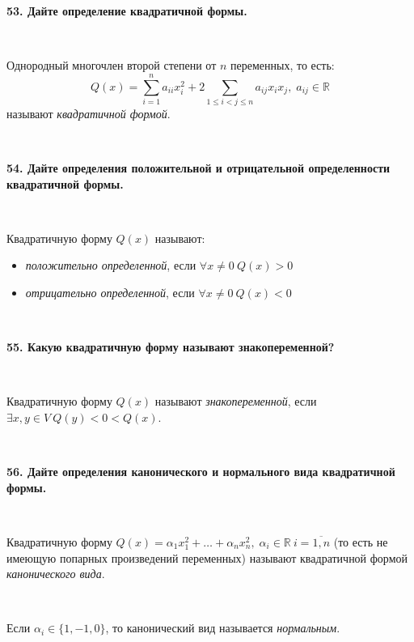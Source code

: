 \documentclass{article}
\begin{document}
	\textbf{53. Дайте определение квадратичной формы.}
	
	{
		$\;$
		\setlength{\parindent}{0.4cm}
		\hangindent=0.4cm
		
		Однородный многочлен второй степени от $n$ переменных, то есть: $$Q(x)=\sum\limits_{i=1}^n a_{ii}x_i^2+2\sum\limits_{1\leq i<j\leq n} a_{ij}x_ix_j,\; a_{ij}\in\mathbb{R}$$называют \textit{квадратичной формой}.
		
		$\;$
		\setlength{\parindent}{0cm}
		\hangindent=0cm
	}
	
	\textbf{54. Дайте определения положительной и отрицательной определенности квадратичной формы.}
	
	{
		$\;$
		\setlength{\parindent}{0.4cm}
		\hangindent=0.4cm
		
		Квадратичную форму $Q(x)$ называют:
		
		\begin{itemize}
		\item \textit{положительно определенной}, если $\forall x\ne 0\ Q(x)>0$
		\item \textit{отрицательно определенной}, если $\forall x\ne 0\ Q(x)<0$\\
		\end{itemize}	
		
		$\;$
		\setlength{\parindent}{0cm}
		\hangindent=0cm
	}
	
	\textbf{55. Какую квадратичную форму называют знакопеременной?}
	
	{
		$\;$
		\setlength{\parindent}{0.4cm}
		\hangindent=0.4cm
		
		Квадратичную форму $Q(x)$ называют \textit{знакопеременной}, если $\exists x, y\in V\ Q(y)<0<Q(x)$.
		
		$\;$
		\setlength{\parindent}{0cm}
		\hangindent=0cm
	}
	
	\textbf{56. Дайте определения канонического и нормального вида квадратичной формы.}
	
	{
		$\;$
		\setlength{\parindent}{0.4cm}
		\hangindent=0.4cm
		
		Квадратичную форму $Q(x)=\alpha_1x_1^2+\ldots+\alpha_nx_n^2, \; \alpha_i\in\mathbb{R}\ i=\overline{1, n}$ (то есть не имеющую попарных произведений переменных) называют квадратичной формой \textit{канонического вида}.
		
		$\;$
		
		Если $\alpha_i\in\{1, -1, 0\}$, то канонический вид называется \textit{нормальным}.
		
		$\;$
		\setlength{\parindent}{0cm}
		\hangindent=0cm
	}
	
\end{document}
